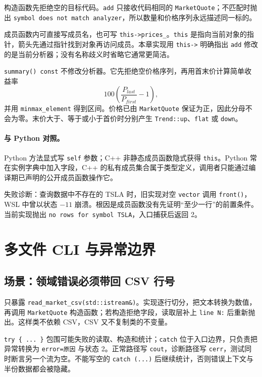 

构造函数先拒绝空的目标代码。\texttt{add} 只接收代码相同的 \texttt{MarketQuote}；不匹配时抛出 \texttt{symbol does not match analyzer}，所以数量和价格序列永远描述同一标的。

成员函数内可直接写成员名，也可写 \texttt{this->prices\_}。\texttt{this} 是指向当前对象的指针，箭头先通过指针找到对象再访问成员。本章实现用 \texttt{this->} 明确指出 \texttt{add} 修改的是当前分析器；没有名称歧义时省略它通常更简洁。

\texttt{summary() const} 不修改分析器。它先拒绝空价格序列，再用首末价计算简单收益率
\[
100\left(\frac{P_{last}}{P_{first}}-1\right),
\]
并用 \texttt{minmax\_element} 得到区间。价格已由 \texttt{MarketQuote} 保证为正，因此分母不会为零。末价大于、等于或小于首价时分别产生 \texttt{Trend::up}、\texttt{flat} 或 \texttt{down}。

\paragraph{与 Python 对照。}
Python 方法显式写 \texttt{self} 参数；C++ 非静态成员函数隐式获得 \texttt{this}。Python 常在实例字典中加入字段，C++ 的私有成员集合属于类型定义，调用者只能通过编译期已声明的公开成员函数操作它。

失败诊断：查询数据中不存在的 TSLA 时，旧实现对空 \texttt{vector} 调用 \texttt{front()}，WSL 中曾以状态 \(-11\) 崩溃。根因是成员函数没有先证明“至少一行”的前置条件。当前实现抛出 \texttt{no rows for symbol TSLA}，入口捕获后返回 2。

\section{多文件 CLI 与异常边界}

\subsection{场景：领域错误必须带回 CSV 行号}

 只暴露 \texttt{read\_market\_csv(std::istream\&)}。实现逐行切分，把文本转换为数值，再调用 \texttt{MarketQuote} 构造函数；若构造拒绝字段，读取层补上 \texttt{line N:} 后重新抛出。这样类不依赖 CSV，CSV 又不复制类的不变量。



\texttt{try \{ ... \}} 包围可能失败的读取、构造和统计；\texttt{catch} 位于入口边界，只负责把异常转换为 \texttt{error=原因} 与状态 2。正常路径写 \texttt{cout}，诊断路径写 \texttt{cerr}，测试同时断言另一个流为空。不能写空的 \texttt{catch (...)} 后继续统计，否则错误上下文与半份数据都会被隐藏。

